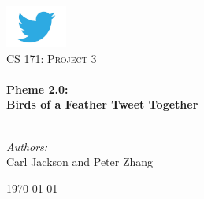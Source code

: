 \begin{titlepage}
\begin{center}

\includegraphics[width=0.15\textwidth]{twitterlogo.jpg}~\\[1cm]


\textsc{\Large CS 171: Project 3}\\[0.5cm]

\HRule \\[0.4cm]
{ \LARGE \bfseries Pheme 2.0: \\ Birds of a Feather Tweet Together} \\[0.4cm]

\HRule \\[1.5cm]

\begin{minipage}{0.6\textwidth}
\begin{flushleft} \large
\emph{Authors:}\\
Carl Jackson and Peter Zhang
\end{flushleft}
\end{minipage}
\begin{minipage}{0.4\textwidth}
\begin{flushright} \large
\end{flushright}
\end{minipage}

\vfill

{\large \today}

\end{center}
\end{titlepage}